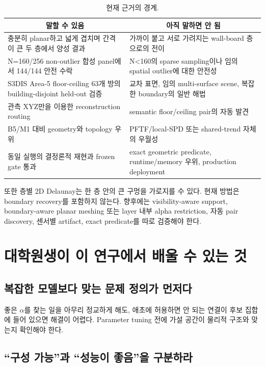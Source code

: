 \documentclass[11pt,a4paper]{article}
\begin{document}
\begin{table}[tbp]
\centering
\caption{현재 근거의 경계.}
\small
\begin{tabularx}{\textwidth}{p{}p{}}
\toprule
\multicolumn{1}{c}{\textbf{말할 수 있음}} &
\multicolumn{1}{c}{\textbf{아직 말하면 안 됨}} \\
\midrule
충분히 planar하고 넓게 겹치며 간격이 큰 두 층에서 양성 결과 &
가까이 붙고 서로 가려지는 wall-board 층으로의 전이 \\
N=160/256 non-outlier 합성 panel에서 144/144 안전 수락 &
N<160의 sparse sampling이나 임의 spatial outlier에 대한 안전성 \\
S3DIS Area-5 floor-ceiling 63개 방의 building-disjoint held-out 검증 &
교차 표면, 임의 multi-surface scene, 복잡한 boundary의 일반 해법 \\
관측 XYZ만을 이용한 reconstruction routing &
semantic floor/ceiling pair의 자동 발견 \\
B5/M1 대비 geometry와 topology 우위 &
PFTF/local-SPD 또는 shared-trend 자체의 우월성 \\
동일 실행의 결정론적 재현과 frozen gate 통과 &
exact geometric predicate, runtime/memory 우위, production deployment \\
\bottomrule
\end{tabularx}
\end{table}

또한 층별 2D Delaunay는 한 층 안의 큰 구멍을 가로지를 수 있다. 현재 방법은
boundary recovery를 포함하지 않는다. 향후에는 visibility-aware support,
boundary-aware planar meshing 또는 layer 내부 alpha restriction, 자동 pair
discovery, 센서별 artifact, exact predicate를 따로 검증해야 한다.

\section{대학원생이 이 연구에서 배울 수 있는 것}

\subsection{복잡한 모델보다 맞는 문제 정의가 먼저다}

좋은 $\alpha$를 찾는 일을 아무리 정교하게 해도, 애초에 허용하면 안 되는 연결이
후보 집합에 들어 있으면 해결이 어렵다. Parameter tuning 전에 가설 공간이 물리적
구조와 맞는지 확인해야 한다.

\subsection{``구성 가능''과 ``성능이 좋음''을 구분하라}
\end{document}
